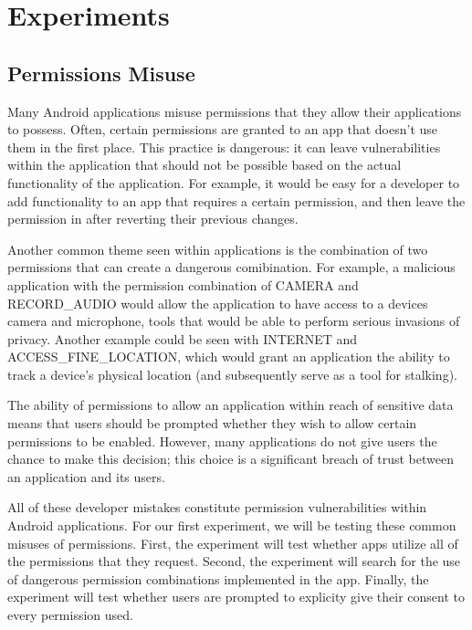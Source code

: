 \section{Experiments}
\label{sec:design}

    \subsection{Permissions Misuse}
    
        Many Android applications misuse permissions that they
        allow their applications to possess. Often, certain
        permissions are granted to an app that doesn't use them
        in the first place. This practice is dangerous: it can 
        leave vulnerabilities within the application that should
        not be possible based on the actual functionality of the
        application. For example, it would be easy for a 
        developer to add functionality to an app that requires a
        certain permission, and then leave the permission in after
        reverting their previous changes. 
        
        Another common theme seen within applications
        is the combination of two permissions that can create a 
        dangerous comibination. For example, a malicious 
        application with the permission combination of
        CAMERA and RECORD\_AUDIO would allow the application
        to have access to a devices camera and microphone, tools
        that would be able to perform serious invasions of privacy. 
        Another example could be seen with INTERNET and 
        ACCESS\_FINE\_LOCATION, which would grant an application the
        ability to track a device's physical location (and 
        subsequently serve as a tool for stalking).

        The ability of permissions to allow an application within
        reach of sensitive data means that users should be prompted
        whether they wish to allow certain permissions to be enabled.
        However, many applications do not give users the chance to 
        make this decision; this choice is a significant breach of trust 
        between an application and its users.

        All of these developer mistakes constitute permission vulnerabilities
        within Android applications. For our first experiment, we
        will be testing these common misuses of permissions. First, 
        the experiment will test whether apps utilize all of the
        permissions that they request. Second, the experiment will 
        search for the use of dangerous permission combinations
        implemented in the app. Finally, the experiment will test whether
        users are prompted to explicity give their consent to every
        permission used.
        
